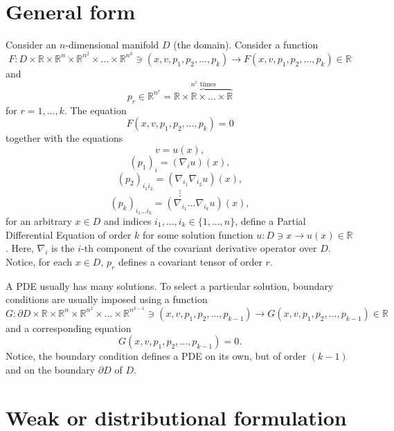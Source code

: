 \documentclass[aps,prl,twocolumn,groupedaddress]{revtex4-2}
\newcommand{\RR}{\mathbb{R}}
\begin{document}
\maketitle
\onecolumngrid



\section{General form}

Consider an $n$-dimensional manifold $D$ (the domain).
Consider a function
$$
F:
D\times \RR\times \RR^n \times \RR^{n^2} \times ... \times \RR^{n^k}
\ni
(x,v,p_1,p_2,...,p_k)
\to
F(x,v,p_1,p_2,...,p_k) \in \RR
$$
and
$$
p_r 
\in 
\RR^{n^r}
=
\overbrace{\RR\times \RR\times ... \times \RR}^{\text{$n^r$ times}}
$$ 
for $r=1,...,k$.
The equation
$$
F(x,v,p_1,p_2,...,p_k) = 0
$$
together with the equations
$$
v = u(x),
$$
$$
(p_1)_i = (\nabla_i u)(x),
$$
$$
(p_2)_{i_1i_2} = (\nabla_{i_1}\nabla_{i_2} u)(x),
$$
$$
\vdots
$$
$$
(p_k)_{i_1...i_k} = (\nabla_{i_1}...\nabla_{i_k} u)(x),
$$
for an arbitrary $x\in D$ and indices $i_1,...,i_k\in \{1,...,n\}$, define a Partial Differential Equation of order $k$ for some solution function $u:D\ni x\to u(x)\in \RR$.
Here, $\nabla_i$ is the $i$-th component of the covariant derivative operator over $D$.
Notice, for each $x\in D$, $p_r$ defines a covariant tensor of order $r$.

A PDE usually has many solutions.
To select a particular solution, boundary conditions are usually imposed using a function
$$
G:
\partial D\times \RR\times \RR^n \times \RR^{n^2} \times ... \times \RR^{n^{k-1}}
\ni
(x,v,p_1,p_2,...,p_{k-1})
\to
G(x,v,p_1,p_2,...,p_{k-1}) \in \RR
$$
and a corresponding equation
$$
G(x,v,p_1,p_2,...,p_{k-1}) = 0.
$$
Notice, the boundary condition defines a PDE on its own, but of order $(k-1)$ and on the boundary $\partial D$ of $D$.

\section{Weak or distributional formulation}
\end{document}
